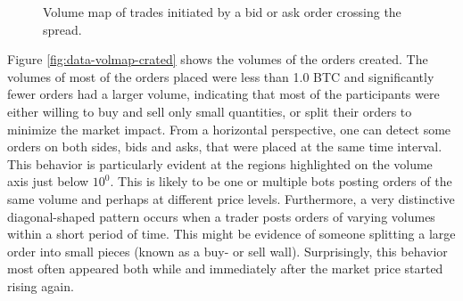 \begin{figure}[H]
    \centering
    \caption{Volume map of trades initiated by a bid or ask order crossing the spread.}
    \label{fig:data-volmap-traded}
\end{figure}
Figure \ref{fig:data-volmap-crated} shows the volumes of the orders created.
The volumes of most of the orders placed were less than 1.0 BTC and significantly fewer orders had a larger volume, indicating that most of the participants were either willing to buy and sell only small quantities, or split their orders to minimize the market impact.
From a horizontal perspective, one can detect some orders on both sides, bids and asks, that were placed at the same time interval.
This behavior is particularly evident at the regions highlighted on the volume axis just below $10^0$.
This is likely to be one or multiple bots posting orders of the same volume and perhaps at different price levels.
Furthermore, a very distinctive diagonal-shaped pattern occurs when a trader posts orders of varying volumes within a short period of time.
This might be evidence of someone splitting a large order into small pieces (known as a buy- or sell wall).
Surprisingly, this behavior most often appeared both while and immediately after the market price started rising again. 

